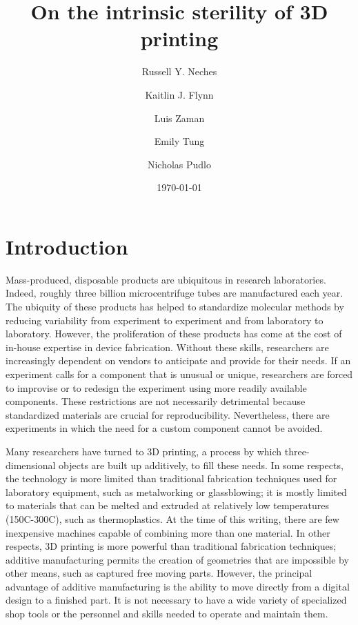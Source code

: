 \documentclass[fleqn,10pt]{wlpeerj}
\title{On the intrinsic sterility of 3D printing}
\author[1]{Russell Y. Neches}
\author[2]{Kaitlin J. Flynn}
\author[3,4]{Luis Zaman}
\author[5]{Emily Tung}
\author[2]{Nicholas Pudlo}
\affil[1]{U.C. Davis Genome Center}
\affil[2]{University of Michigan}
\affil[3]{Michigan State University}
\affil[4]{University of Washington}
\affil[5]{Pivot Bio}
\date{\today}
\begin{document}
\flushbottom
\maketitle
\thispagestyle{empty}


\section{Introduction}

Mass-produced, disposable products are ubiquitous in research laboratories.
Indeed, roughly three billion microcentrifuge tubes are manufactured each
year. \cite{eppy} The ubiquity of these products has helped to standardize molecular
methods by reducing variability from experiment to experiment and from
laboratory to laboratory. However, the proliferation of these products has
come at the cost of in-house expertise in device fabrication. Without these
skills, researchers are increasingly dependent on vendors to anticipate and
provide for their needs. If an experiment calls for a component that is
unusual or unique, researchers are forced to improvise or to redesign the
experiment using more readily available components. These restrictions are not
necessarily detrimental because standardized materials are crucial for reproducibility.
Nevertheless, there are experiments in which the need for a custom component
cannot be avoided.

Many researchers have turned to 3D printing, a process by which three-dimensional objects are built up additively, to fill these needs. In some respects, the technology is more limited than traditional fabrication techniques used for laboratory equipment, such as metalworking or glassblowing; it is mostly limited to materials that can be melted and extruded at relatively low temperatures (150C-300C), such as thermoplastics. At the time of this writing, there are few inexpensive machines capable of combining more than one material. In other respects, 3D printing is more powerful than traditional fabrication techniques; additive manufacturing permits the creation of geometries that are impossible by other means, such as captured free moving parts. However, the principal advantage of additive manufacturing is the ability to move directly from a digital design to a finished part. It is not necessary to have a wide variety of specialized shop tools or the personnel and skills needed to operate and maintain them.
\end{document}
